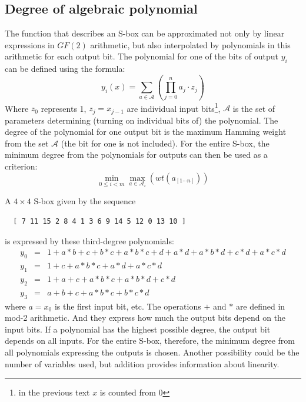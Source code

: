 \subsection{Degree of algebraic polynomial}
The function that describes an S-box can be approximated not only by linear expressions in $GF(2)$ arithmetic,
but also interpolated by polynomials in this arithmetic for each output bit. The polynomial for one of the bits
of output $y_i$ can be defined using the formula:
\begin{equation}
  y_i(x) = \sum\limits_{a \in \mathcal{A}} \left(\prod\limits_{j=0}^{n} a_j \cdot z_j \right)
\end{equation}
Where $z_0$ represents 1, $z_j = x_{j - 1}$ are individual input bits\footnote{in the previous text $x$ is counted from 0},
$\mathcal{A}$ is the set of parameters determining (turning on individual bits of) the polynomial.
The degree of the polynomial for one output bit is the maximum Hamming weight from the set $\mathcal{A}$ (the bit for one is not included).
For the entire S-box, the minimum degree from the polynomials for outputs can then be used as a criterion:
\begin{equation}
  \min\limits_{0 \leq i < m} \max\limits_{a \in \mathcal{A}_i} \left( wt(a_{[1 \cdots n]}) \right)
\end{equation}

\pagebreak
A $4 \times 4$ S-box given by the sequence
\begin{verbatim}
  [ 7 11 15 2 8 4 1 3 6 9 14 5 12 0 13 10 ]
\end{verbatim}
\nopagebreak
is expressed by these third-degree polynomials:
\nopagebreak
\begin{eqnarray}
  y_0 & = & 1 + a*b + c + b*c + a*b*c + d + a*d + a*b*d + c*d + a*c*d\\
  y_1 & = & 1 + c + a*b*c + a*d + a*c*d\\
  y_2 & = & 1 + a + c + a*b*c + a*b*d + c*d\\
  y_3 & = & a + b + c + a*b*c + b*c*d
\end{eqnarray}
where $a = x_0$ is the first input bit, etc. The operations $+$ and $*$ are defined in mod-2 arithmetic.
And they express how much the output bits depend on the input bits. If a polynomial has the highest
possible degree, the output bit depends on all inputs. For the entire S-box, therefore, the minimum
degree from all polynomials expressing the outputs is chosen. Another possibility
could be the number of variables used, but addition provides information about linearity.

